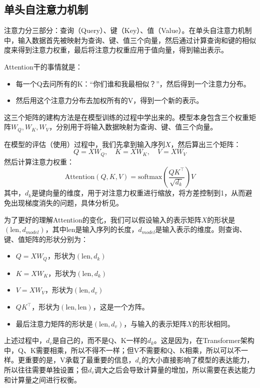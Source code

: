 \subsection{单头自注意力机制}

注意力分三部分：查询（Query）、键（Key）、值（Value）。在单头自注意力机制中，输入数据首先被映射为查询、键、值三个向量，然后通过计算查询和键的相似度来得到注意力权重，最后将注意力权重应用于值向量，得到输出表示。

Attention干的事情就是：
\begin{itemize}
    \item 每一个Q去问所有的K：“你们谁和我最相似？”，然后得到一个注意力分布。
    \item 然后用这个注意力分布去加权所有的V，得到一个新的表示。
\end{itemize}
这三个矩阵的建构方法是在模型训练的过程中学出来的。模型本身包含三个权重矩阵$W_Q, W_K, W_V$，分别用于将输入数据映射为查询、键、值三个向量。

在模型的评估（使用）过程中，我们先拿到输入序列$X$，然后算出三个矩阵：
\begin{equation}
    Q = XW_Q, \quad K = XW_K, \quad V = XW_V
\end{equation}
然后计算注意力权重：
\begin{equation}
    \text{Attention}(Q, K, V) = \text{softmax}\left(\frac{QK^\top}{\sqrt{d_k}}\right)V
\end{equation}
其中，$d_k$是键向量的维度，用于对注意力权重进行缩放，将方差控制到1，从而避免出现梯度消失的问题，具体分析见。

为了更好的理解Attention的变化，我们可以假设输入的表示矩阵$X$的形状是$(\text{len}, d_{model})$，其中$\text{len}$是输入序列的长度，$d_{model}$是输入表示的维度。则查询、键、值矩阵的形状分别为：
\begin{itemize}
    \item $Q = XW_Q$，形状为$(\text{len}, d_k)$
    \item $K = XW_K$，形状为$(\text{len}, d_k)$
    \item $V = XW_V$，形状为$(\text{len}, d_v)$
    \item $QK^\top$，形状为$(\text{len}, \text{len})$，这是一个方阵。
    \item 最后注意力矩阵的形状是$(\text{len}, d_v)$，与输入的表示矩阵$X$的形状相同。
\end{itemize}

上述过程中，$d_v$是自己的，而不是Q、K一样的$d_k$。这是因为，在Transformer架构中，Q、K需要相乘，所以不得不一样；但V不需要和Q、K相乘，所以可以不一样。更重要的是，V承载了最重要的信息，$d_v$的大小直接影响了模型的表达能力，所以往往需要单独设置；但$d_v$调大之后会导致计算量的增加，所以需要在表达能力和计算量之间进行权衡。

